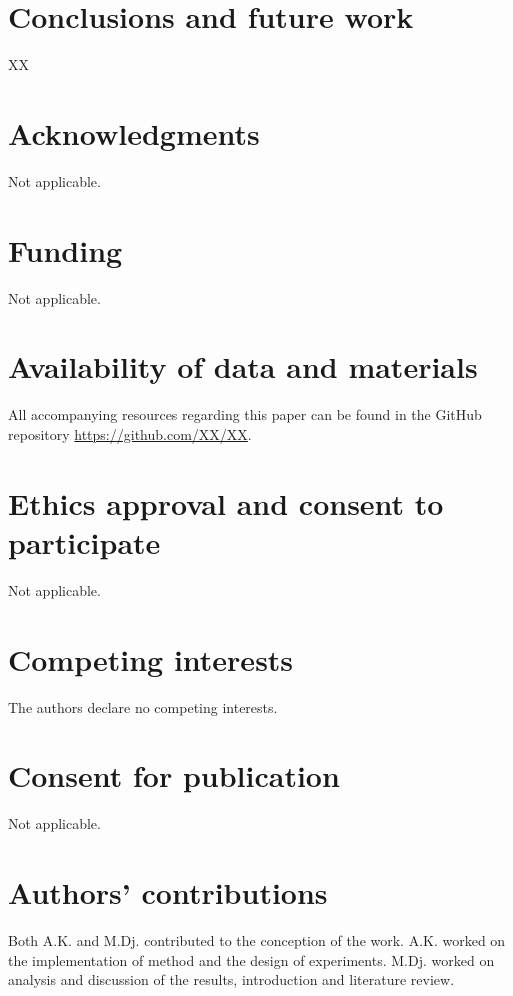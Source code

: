 \documentclass{bmcart}
\begin{document}
\section{Conclusions and future work}\label{sec:conclusions}
XX
\begin{backmatter}

 \section*{Acknowledgments}%
Not applicable.

 \section*{Funding}%
Not applicable.


  \section*{Availability of data and materials}%
 All accompanying resources regarding this paper can be found in the GitHub repository \url{https://github.com/XX/XX}. 

\section*{Ethics approval and consent to participate}%
Not applicable. 

\section*{Competing interests}
The authors declare  no competing interests.

\section*{Consent for publication}%
Not applicable. 

\section*{Authors' contributions}
Both A.K. and M.Dj. contributed to the conception of the work. A.K. worked on the implementation of method and the design of experiments. M.Dj. worked on analysis and discussion of the results, introduction and literature review. 


\end{backmatter}
\end{document}
